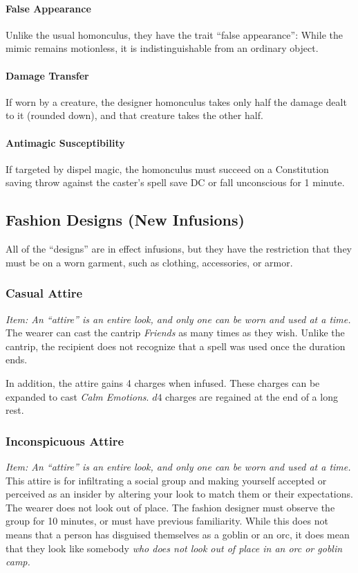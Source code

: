 \documentclass[twocolumn]{dndbook}
\begin{document}
\paragraph{False Appearance}
Unlike the usual homonculus, they have the trait ``false appearance'':
While the mimic remains motionless, it is indistinguishable from an ordinary object.

\paragraph{Damage Transfer}
If worn by a creature, the designer homonculus takes only half the damage dealt to it (rounded down), and that creature takes the other half.

\paragraph{Antimagic Susceptibility}
If targeted by dispel magic, the homonculus must succeed on a Constitution saving throw against the caster's spell save DC or fall unconscious for 1 minute.


\subsection{Fashion Designs (New Infusions)}

All of the ``designs'' are in effect infusions, but they have the restriction that they must be on a worn garment, such as clothing, accessories, or armor.\par

\subsubsection{Casual Attire}
\emph{Item: An ``attire'' is an entire look, and only one can be worn and used at a time.}
The wearer can cast the cantrip \emph{Friends} as many times as they wish.
Unlike the cantrip, the recipient does not recognize that a spell was used once the duration ends.\par

In addition, the attire gains 4 charges when infused.
These charges can be expanded to cast \emph{Calm Emotions}.
$d4$ charges are regained at the end of a long rest.

\subsubsection{Inconspicuous Attire}
\emph{Item: An ``attire'' is an entire look, and only one can be worn and used at a time.}
This attire is for infiltrating a social group and making yourself accepted or perceived as an insider by altering your look to match them or their expectations.
The wearer does not look out of place.
The fashion designer must observe the group for 10 minutes, or must have previous familiarity.
While this does not means that a person has disguised themselves as a goblin or an orc,
it does mean that they look like somebody \emph{who does not look out of place in an orc or goblin camp.}
\end{document}
